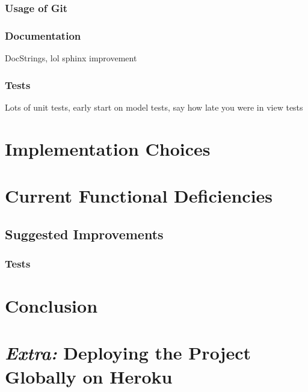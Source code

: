 \documentclass[11pt,a4paper]{article}
\begin{document}
\subsubsection{Usage of Git}
\subsubsection{Documentation}
DocStrings, lol sphinx improvement
\subsubsection{Tests}
Lots of unit tests, early start on model tests, say how late you were in view tests

\section{Implementation Choices}
\section{Current Functional Deficiencies}

\subsection{Suggested Improvements}

\subsubsection{Tests}


\section{Conclusion}

\section{\textit{Extra:} Deploying the Project Globally on Heroku}
\end{document}

